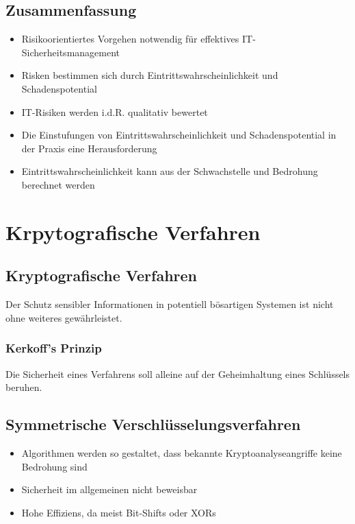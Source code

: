 \subsection{Zusammenfassung}
\begin{itemize}
	\item Risikoorientiertes Vorgehen notwendig für effektives IT-Sicherheitsmanagement
	\item Risken bestimmen sich durch Eintrittswahrscheinlichkeit und Schadenspotential
	\item IT-Risiken werden i.d.R. qualitativ bewertet
	\item Die Einstufungen von Eintrittswahrscheinlichkeit und Schadenspotential in der Praxis eine Herausforderung
	\item Eintrittswahrscheinlichkeit kann aus der Schwachstelle und Bedrohung berechnet werden
\end{itemize}



\section{Krpytografische Verfahren}

\subsection{Kryptografische Verfahren}
Der Schutz sensibler Informationen in potentiell bösartigen Systemen ist nicht ohne weiteres gewährleistet.

\subsubsection{Kerkoff's Prinzip}
Die Sicherheit eines Verfahrens soll alleine auf der Geheimhaltung eines Schlüssels beruhen.

\subsection{Symmetrische Verschlüsselungsverfahren}
\begin{itemize}
	\item Algorithmen werden so gestaltet, dass bekannte Kryptoanalyseangriffe keine Bedrohung sind
	\item Sicherheit im allgemeinen nicht beweisbar
	\item Hohe Effiziens, da meist Bit-Shifts oder XORs
\end{itemize}

